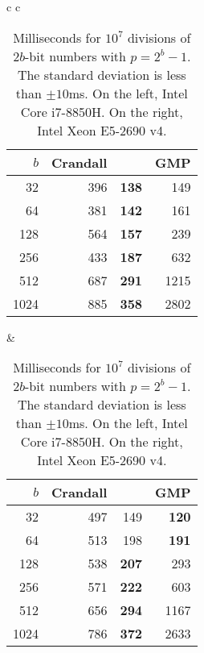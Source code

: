 \begin{table}[H]
   \centering
   \begin{tabular}{ c c }
      \begin{tabular}{ r | r r r }
         $b$ & Crandall & \Cref{alg:division-generalized} & GMP \\
         \hline
         32 & 396 & \textbf   {138}  & 149\\
         64 & 381 &   \textbf {142}  & 161\\
         128 & 564 &  \textbf {157}  & 239\\
         256 & 433 &  \textbf {187}  & 632\\
         512 & 687 &  \textbf {291}  & 1215\\
         1024 & 885 & \textbf {358}  & 2802
      \end{tabular}
      \hspace{.5em}
      &
      \hspace{.5em}
      \begin{tabular}{ r | r r r }
         $b$ & Crandall & \Cref{alg:division-generalized} & GMP\\
         \hline
         32 & 497 & 149 & \textbf{120}\\
         64 & 513 & 198 & \textbf{191}\\
         128 & 538 & \textbf{207} & 293\\
         256 & 571 & \textbf{222} & 603\\
         512 & 656 & \textbf{294} & 1167\\
         1024 & 786 & \textbf{372} & 2633\\
      \end{tabular}
   \end{tabular}
   \caption{Milliseconds for $10^7$ divisions of $2b$-bit numbers with $p=2^b-1$.
      The standard deviation is less than $\pm10$ms.
         On the left, Intel Core i7-8850H.
         On the right, Intel Xeon E5-2690 v4.
   }
   \label{tab:division-experiments}
\end{table}


